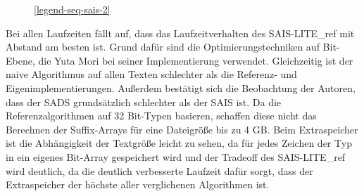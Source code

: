 \begin{figure}[ht]

    \medskip
    \ref{legend-seq-sais-2}
\end{figure}
\FloatBarrier
{}
\noindent Bei allen Laufzeiten fällt auf, dass das Laufzeitverhalten des SAIS-LITE\_ref mit Abstand am besten ist. Grund dafür sind die Optimierungstechniken auf Bit-Ebene, die Yuta Mori bei seiner Implementierung verwendet. Gleichzeitig ist der naive Algorithmus auf allen Texten schlechter als die Referenz- und Eigenimplementierungen. Außerdem bestätigt sich die Beobachtung der Autoren, dass der SADS grundsätzlich schlechter als der SAIS ist. Da die Referenzalgorithmen auf 32 Bit-Typen basieren, schaffen diese nicht das Berechnen der Suffix-Arrays für eine Dateigröße bis zu 4 GB. Beim Extraspeicher ist die Abhängigkeit der Textgröße leicht zu sehen, da für jedes Zeichen der Typ in ein eigenes Bit-Array gespeichert wird und der Tradeoff des SAIS-LITE\_ref wird deutlich, da die deutlich verbesserte Laufzeit dafür sorgt, dass der Extraspeicher der höchste aller verglichenen Algorithmen ist.
